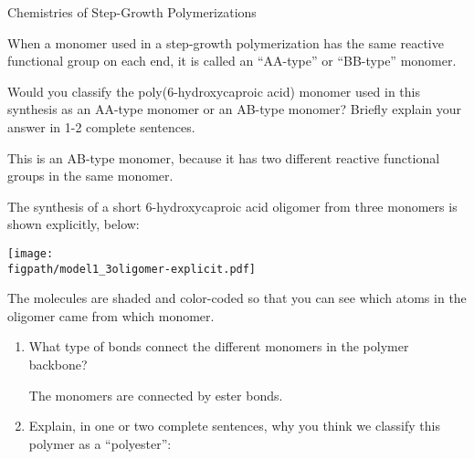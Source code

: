 \begin{activity}{Chemistries of Step-Growth Polymerizations}
\begin{infobox}
	When a monomer used in a step-growth polymerization has the same reactive functional group on each end, it is called an ``AA-type'' or ``BB-type'' monomer.

\end{infobox}

\begin{ctqs}
		
		\question Would you classify the poly(6-hydroxycaproic acid) monomer used in this synthesis as an AA-type monomer or an AB-type monomer?  Briefly explain your answer in 1-2 complete sentences.
			
				\begin{solution}[1.75in]
					This is an AB-type monomer, because it has two different reactive functional groups in the same monomer.
				\end{solution}
		
		\question The synthesis of a short 6-hydroxycaproic acid oligomer from three monomers is shown explicitly, below: \label{\labelbase:ctq:6hcpa-oligomer}
	
\vspace{0.25in}	\centerline{\texttt{[image: \\figpath/model1\_3oligomer-explicit.pdf]}}
The molecules are shaded and color-coded so that you can see which atoms in the oligomer came from which monomer.
		
		\begin{enumerate}
		
			\item What type of bonds connect the different monomers in the polymer backbone?
			
				\begin{solution}[1.5in]
					The monomers are connected by ester bonds.
				\end{solution}
		
			\item Explain, in one or two complete sentences, why you think we classify this polymer as a ``polyester'':
			
				\begin{solution}[2in]\end{solution}
	

\end{enumerate}
\end{ctqs}
\end{activity}
